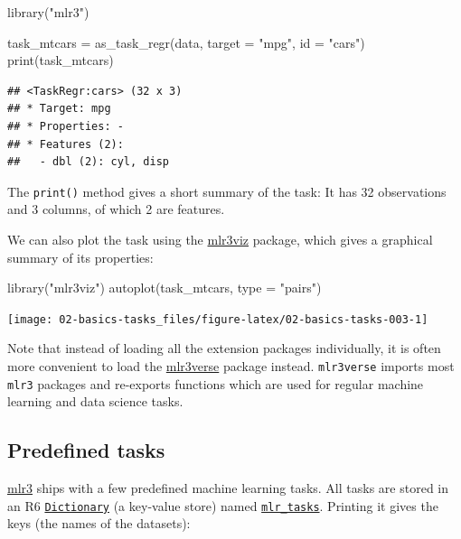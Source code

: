 \documentclass[
]{scrbook}
\newenvironment{Shaded}{\begin{snugshade}}{\end{snugshade}}
\newcommand{\AttributeTok}[1]{\textcolor[rgb]{0.77,0.63,0.00}{#1}}
\newcommand{\FunctionTok}[1]{\textcolor[rgb]{0.00,0.00,0.00}{#1}}
\newcommand{\NormalTok}[1]{#1}
\newcommand{\OtherTok}[1]{\textcolor[rgb]{0.56,0.35,0.01}{#1}}
\newcommand{\StringTok}[1]{\textcolor[rgb]{0.31,0.60,0.02}{#1}}
\renewenvironment{Shaded} {\begin{snugshade}\small} {\end{snugshade}}
\begin{document}
\begin{Shaded}
\begin{Highlighting}[]
\FunctionTok{library}\NormalTok{(}\StringTok{"mlr3"}\NormalTok{)}

\NormalTok{task\_mtcars }\OtherTok{=} \FunctionTok{as\_task\_regr}\NormalTok{(data, }\AttributeTok{target =} \StringTok{"mpg"}\NormalTok{, }\AttributeTok{id =} \StringTok{"cars"}\NormalTok{)}
\FunctionTok{print}\NormalTok{(task\_mtcars)}
\end{Highlighting}
\end{Shaded}

\begin{verbatim}
## <TaskRegr:cars> (32 x 3)
## * Target: mpg
## * Properties: -
## * Features (2):
##   - dbl (2): cyl, disp
\end{verbatim}

The \texttt{print()} method gives a short summary of the task:
It has 32 observations and 3 columns, of which 2 are features.

We can also plot the task using the \href{https://mlr3viz.mlr-org.com}{mlr3viz} package, which gives a graphical summary of its properties:

\begin{Shaded}
\begin{Highlighting}[]
\FunctionTok{library}\NormalTok{(}\StringTok{"mlr3viz"}\NormalTok{)}
\FunctionTok{autoplot}\NormalTok{(task\_mtcars, }\AttributeTok{type =} \StringTok{"pairs"}\NormalTok{)}
\end{Highlighting}
\end{Shaded}

\begin{center}\texttt{[image: 02-basics-tasks\_files/figure-latex/02-basics-tasks-003-1]} \end{center}

Note that instead of loading all the extension packages individually, it is often more convenient to load the \href{https://mlr3verse.mlr-org.com}{mlr3verse} package instead.
\texttt{mlr3verse} imports most \texttt{mlr3} packages and re-exports functions which are used for regular machine learning and data science tasks.

\hypertarget{tasks-predefined}{%
\subsection{Predefined tasks}\label{tasks-predefined}}

\href{https://mlr3.mlr-org.com}{mlr3} ships with a few predefined machine learning tasks.
All tasks are stored in an R6 \href{https://mlr3misc.mlr-org.com/reference/Dictionary.html}{\texttt{Dictionary}} (a key-value store) named \href{https://mlr3.mlr-org.com/reference/mlr_tasks.html}{\texttt{mlr\_tasks}}.
Printing it gives the keys (the names of the datasets):
\end{document}
